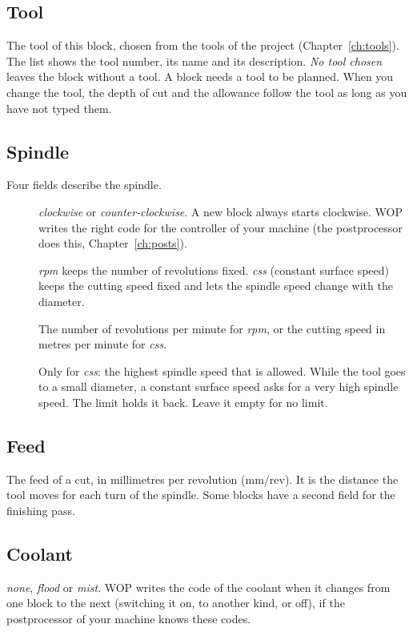 \subsection{Tool}
The tool of this block, chosen from the tools of the project (Chapter~\ref{ch:tools}). The list shows the tool number, its name and its description. \emph{No tool chosen} leaves the block without a tool. A block needs a tool to be planned. When you change the tool, the depth of cut and the allowance follow the tool as long as you have not typed them.

\subsection{Spindle}
Four fields describe the spindle.

\begin{description}
\item[] \emph{clockwise} or \emph{counter-clockwise}. A new block always starts clockwise. WOP writes the right code for the controller of your machine (the postprocessor does this, Chapter~\ref{ch:posts}).
\item[] \emph{rpm} keeps the number of revolutions fixed. \emph{css} (constant surface speed) keeps the cutting speed fixed and lets the spindle speed change with the diameter.
\item[] The number of revolutions per minute for \emph{rpm}, or the cutting speed in metres per minute for \emph{css}.
\item[] Only for \emph{css}: the highest spindle speed that is allowed. While the tool goes to a small diameter, a constant surface speed asks for a very high spindle speed. The limit holds it back. Leave it empty for no limit.
\end{description}

\subsection{Feed}
The feed of a cut, in millimetres per revolution (mm/rev). It is the distance the tool moves for each turn of the spindle. Some blocks have a second field for the finishing pass.

\subsection{Coolant}
\emph{none}, \emph{flood} or \emph{mist}. WOP writes the code of the coolant when it changes from one block to the next (switching it on, to another kind, or off), if the postprocessor of your machine knows these codes.

